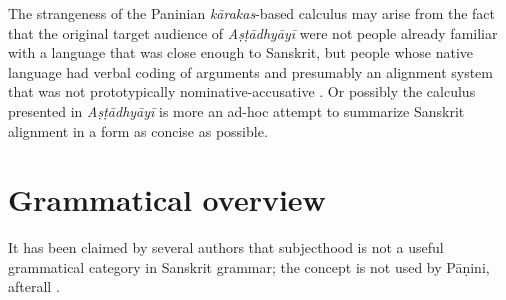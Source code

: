 \documentclass[a4paper, oneside, 12pt]{report}
\newcommand{\form}[1]{\emph{#1}}
\begin{document}
The strangeness of the Paninian \form{kārakas}-based calculus may arise from the fact
that the original target audience of \form{Aṣṭādhyāyī} were not people already familiar with a language that was close enough to Sanskrit,
but people whose native language had verbal coding of arguments and
presumably an alignment system that was not prototypically nominative-accusative
\citep{keidan2017subjecthood}.
Or possibly the calculus presented in \form{Aṣṭādhyāyī} is more an ad-hoc attempt to summarize Sanskrit alignment
in a form as concise as possible.

\chapter{Grammatical overview}

It has been claimed by several authors that subjecthood is not a useful grammatical category in Sanskrit grammar;
the concept is not used by Pāṇini, afterall \citep{keidan2017subjecthood,kiparsky2009architecture}. 




\end{document}
